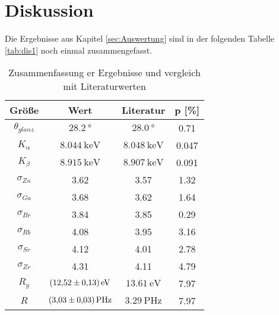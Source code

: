 \newpage
\section{Diskussion}
\label{sec:Diskussion}
Die Ergebnisse aus Kapitel \ref{sec:Auswertung} sind in der folgenden Tabelle \ref{tab:dis1} noch einmal zusammengefasst. 
\begin{table}[H]
    \centering
        \caption{Zusammenfassung er Ergebnisse und vergleich mit Literaturwerten}
        \label{tab:diss1}
        \begin{tabular}{S S S S}
          \toprule
          {Größe} & {Wert} & {Literatur} & {p [\%]}\\
          \midrule
          {$\theta_{glanz}$} & {$\SI{28.2 }{\degree}           $}    & {$\SI{28.0 }{\degree}           $} & 0.71  \\
          {$K_{\alpha}$}     & {$\SI{8.044}{\kilo\electronvolt}$}    & {$\SI{8.048}{\kilo\electronvolt}$} & 0.047 \\
          {$K_{\beta} $}     & {$\SI{8.915}{\kilo\electronvolt}$}    & {$\SI{8.907}{\kilo\electronvolt}$} & 0.091 \\
          {$\sigma_{Zn}$}    & 3.62                                  & 3.57                               & 1.32  \\   
          {$\sigma_{Ga}$}    & 3.68                                  & 3.62                               & 1.64  \\  
          {$\sigma_{Br}$}    & 3.84                                  & 3.85                               & 0.29  \\  
          {$\sigma_{Rb}$}    & 4.08                                  & 3.95                               & 3.16  \\  
          {$\sigma_{Sr}$}    & 4.12                                  & 4.01                               & 2.78  \\  
          {$\sigma_{Zr}$}    & 4.31                                  & 4.11                               & 4.79  \\
          {$R_y$}            & {$\SI{12.52\pm 0.13}{\electronvolt}$} & {$\SI{13.61}{\electronvolt}$}      & 7.97  \\
          {$R$}              & {$\SI{3.03\pm 0.03}{\peta\hertz}$}    & {$\SI{3.29}{\peta\hertz}$}         & 7.97  \\
          \bottomrule
        \end{tabular}
      \end{table}
